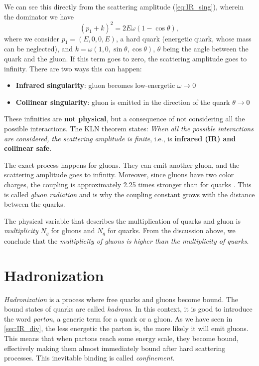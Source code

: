 We can see this directly from the scattering amplitude (\ref{eq:IR_sing}), wherein the dominator we have
\begin{equation}
    \label{eq:IR_sing}
    (p_1+k)^2 = 2E\omega(1- \cos{\theta}),
\end{equation}
where we consider $p_1 = (E,0,0,E)$, a hard quark (energetic quark, whose mass can be neglected), and $k = \omega (1, 0, \sin{\theta}, \cos{\theta})$, $\theta$ being the angle between the quark and the gluon.
If this term goes to zero, the scattering amplitude goes to infinity.
There are two ways this can happen: 
\begin{itemize}
    \item \textbf{Infrared singularity}: gluon becomes low-energetic $\omega \rightarrow 0$
    \item \textbf{Collinear singularity}: gluon is emitted in the direction of the quark $\theta \rightarrow 0$
\end{itemize}
These infinities are \textbf{not physical}, but a consequence of not considering all the possible interactions.
The KLN theorem \cite{IR_sing_K,IR_sing_LN} states: \emph{When all the possible interactions are considered, the scattering amplitude is finite}, i.e., is \textbf{infrared (IR) and collinear safe}. 

The exact process happens for gluons. 
They can emit another gluon, and the scattering amplitude goes to infinity.
Moreover, since gluons have two color charges, the coupling is approximately 2.25 times stronger than for quarks \cite{qcd_salam}.
This is called \emph{gluon radiation} and is why the coupling constant grows with the distance between the quarks.

The physical variable that describes the multiplication of quarks and gluon is \emph{multiplicity} $N_g$ for gluons and $N_q$ for quarks.
From the discussion above, we conclude that the \emph{multiplicity of gluons is higher than the multiplicity of quarks}.

\section{Hadronization}
\label{sec:hadronisation}
\emph{Hadronization} is a process where free quarks and gluons become bound.
The bound states of quarks are called \emph{hadrons}.
In this context, it is good to introduce the word \emph{parton}, a generic term for a quark or a gluon.
As we have seen in \cref{sec:IR_div}, the less energetic the parton is, the more likely it will emit gluons.
This means that when partons reach some energy scale, they become bound, effectively making them almost immediately bound after hard scattering processes.
This inevitable binding is called \emph{confinement}.


